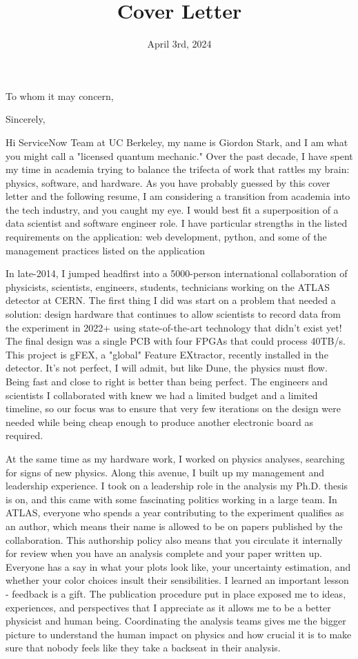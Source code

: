 \documentclass[10pt,letterpaper,sans]{moderncv} %
\title{Cover Letter}
\begin{document}
\date{April 3rd, 2024}
\opening{To whom it may concern,}
\closing{Sincerely,}

\makelettertitle
\vspace*{-1em}

Hi ServiceNow Team at UC Berkeley, my name is Giordon Stark, and I am what you might call a "licensed quantum mechanic." Over the past decade, I have spent my time in academia trying to balance the trifecta of work that rattles my brain: physics, software, and hardware. As you have probably guessed by this cover letter and the following resume, I am considering a transition from academia into the tech industry, and you caught my eye. I would best fit a superposition of a data scientist and software engineer role. I have particular strengths in the listed requirements on the application: web development, python, and some of the management practices listed on the application

In late-2014, I jumped headfirst into a 5000-person international collaboration of physicists, scientists, engineers, students, technicians working on the ATLAS detector at CERN. The first thing I did was start on a problem that needed a solution: design hardware that continues to allow scientists to record data from the experiment in 2022+ using state-of-the-art technology that didn't exist yet! The final design was a single PCB with four FPGAs that could process 40TB/s. This project is gFEX, a "global" Feature EXtractor, recently installed in the detector. It's not perfect, I will admit, but like Dune, the physics must flow. Being fast and close to right is better than being perfect. The engineers and scientists I collaborated with knew we had a limited budget and a limited timeline, so our focus was to ensure that very few iterations on the design were needed while being cheap enough to produce another electronic board as required.

At the same time as my hardware work, I worked on physics analyses, searching for signs of new physics. Along this avenue, I built up my management and leadership experience. I took on a leadership role in the analysis my Ph.D. thesis is on, and this came with some fascinating politics working in a large team. In ATLAS, everyone who spends a year contributing to the experiment qualifies as an author, which means their name is allowed to be on papers published by the collaboration. This authorship policy also means that you circulate it internally for review when you have an analysis complete and your paper written up. Everyone has a say in what your plots look like, your uncertainty estimation, and whether your color choices insult their sensibilities. I learned an important lesson - feedback is a gift. The publication procedure put in place exposed me to ideas, experiences, and perspectives that I appreciate as it allows me to be a better physicist and human being. Coordinating the analysis teams gives me the bigger picture to understand the human impact on physics and how crucial it is to make sure that nobody feels like they take a backseat in their analysis.
\end{document}
